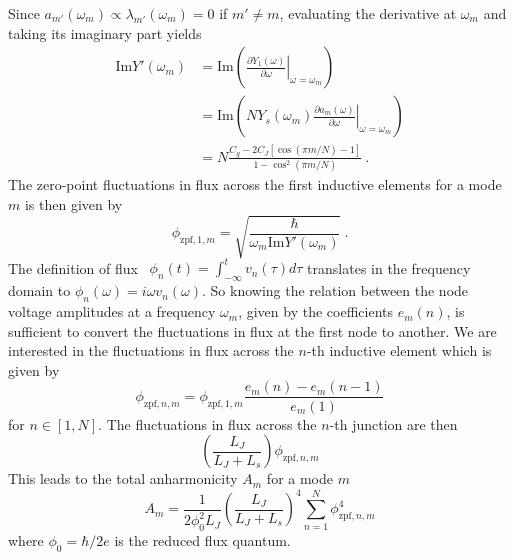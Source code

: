 Since $a_{m'}(\omega_m)\propto \lambda_{m'}(\omega_m) = 0$ if $m'\ne m$, evaluating the derivative at $\omega_m$ and taking its imaginary part yields
\begin{equation}
\begin{split}
\text{Im}Y'(\omega_m)&=\text{Im}\left(\left.\frac{\partial Y_{1}(\omega)}{\partial\omega}\right|_{\omega = \omega_m}\right)\\
&=  \text{Im}\left(NY_s(\omega_m)\left. \frac{\partial a_m(\omega)}{\partial\omega}\right|_{\omega = \omega_m}\right)\\
&=N\frac{C_g-2C_J\left[ \cos (\pi m/ N) - 1\right]}{1-\cos^2 (\pi m/ N)}\ .
\end{split}
\end{equation}
The zero-point fluctuations in flux across the first inductive elements for a mode $m$ is then given by~\cite{gely_qucatquantum_2019,nigg_blackboxsuperconducting_2012}
\begin{equation}
\phi_{\text{zpf},1,m} = \sqrt{\frac{\hbar}{\omega_m\text{Im}Y'(\omega_m)}}\ .
\end{equation}
The definition of flux~\cite{vool_introductionquantum_2017} $\phi_n(t) = \int_{-\infty}^tv_n(\tau)d\tau$ translates in the frequency domain to $\phi_n(\omega) = i\omega v_n(\omega)$.
%
So knowing the relation between the node voltage amplitudes at a frequency $\omega_m$, given by the coefficients $e_m(n)$, is sufficient to convert the fluctuations in flux at the first node to another.
%
We are interested in the fluctuations in flux across the $n$-th inductive element which is given by
\begin{equation}
\phi_{\text{zpf},n,m} = \phi_{\text{zpf},1,m}\frac{e_m(n)-e_m(n-1)}{e_m(1)}
\end{equation}
for $n\in[1,N]$.
%
The fluctuations in flux across the $n$-th junction are then
\begin{equation}
\left(\frac{L_J}{L_J+L_s}\right)\phi_{\text{zpf},n,m}
\end{equation}
%
This leads to the total anharmonicity $A_m$ for a mode $m$
\begin{equation}
A_m = \frac{1}{2\phi_0^2L_J}\left(\frac{L_J}{L_J+L_s}\right)^4\sum_{n=1}^{N}\phi_{\text{zpf},n,m}^4
\end{equation}
where $\phi_0 = \hbar/2e$ is the reduced flux quantum.

%
